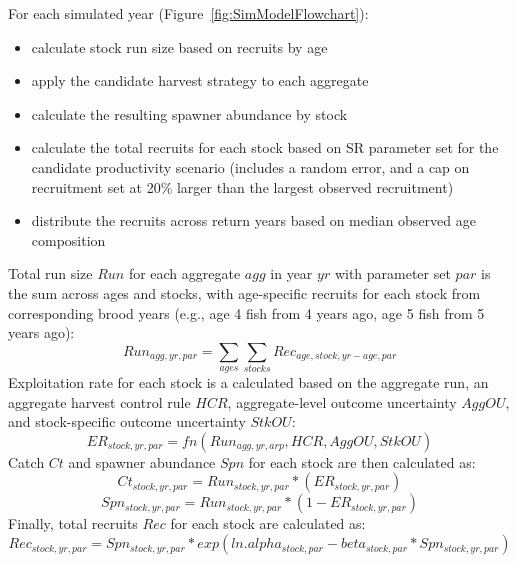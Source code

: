 \documentclass[french,11pt]{book}
\begin{document}
For each simulated year (Figure~\ref{fig:SimModelFlowchart}):
\begin{itemize}

\item
  calculate stock run size based on recruits by age
\item
  apply the candidate harvest strategy to each aggregate
\item
  calculate the resulting spawner abundance by stock
\item
  calculate the total recruits for each stock based on SR parameter set for the candidate productivity scenario (includes a random error, and a cap on recruitment set at 20\% larger than the largest observed recruitment)
\item
  distribute the recruits across return years based on median observed age composition
\end{itemize}
Total run size \(Run\) for each aggregate \(agg\) in year \(yr\) with parameter set \(par\) is the sum across ages and stocks, with age-specific recruits for each stock from corresponding brood years (e.g., age 4 fish from 4 years ago, age 5 fish from 5 years ago):
\begin{equation} 
  Run_{agg,yr,par} =  \sum_{ages}\sum_{stocks} Rec_{age,stock,yr-age,par}
\end{equation}
Exploitation rate for each stock is a calculated based on the aggregate run, an aggregate harvest control rule \(HCR\), aggregate-level outcome uncertainty \(AggOU\), and stock-specific outcome uncertainty \(StkOU\):
\begin{equation} 
  ER_{stock,yr,par} = fn(Run_{agg,yr,arp}, HCR, AggOU, StkOU)
\end{equation}
Catch \(Ct\) and spawner abundance \(Spn\) for each stock are then calculated as:
\begin{equation} 
  Ct_{stock,yr,par} = Run_{stock,yr,par} * ( ER_{stock,yr,par}) 
\end{equation}
\begin{equation} 
  Spn_{stock,yr,par} = Run_{stock,yr,par} * (1 - ER_{stock,yr,par}) 
\end{equation}
Finally, total recruits \(Rec\) for each stock are calculated as:
\begin{equation} 
  Rec_{stock,yr,par} =  Spn_{stock,yr,par} * exp(ln.alpha_{stock,par} -  beta_{stock,par} * Spn_{stock,yr,par}) 
\end{equation}
\end{document}
